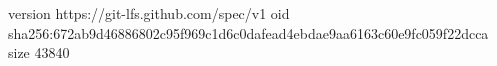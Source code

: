 version https://git-lfs.github.com/spec/v1
oid sha256:672ab9d46886802c95f969c1d6c0dafead4ebdae9aa6163c60e9fc059f22dcca
size 43840
